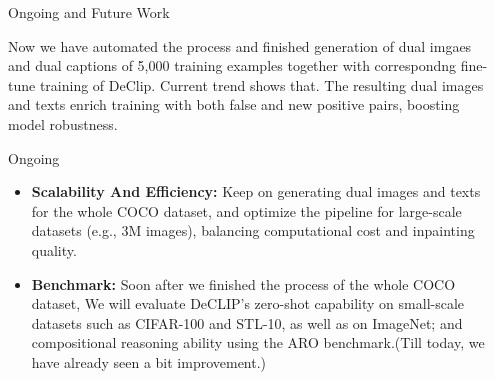 \documentclass[final]{beamer}
\newlength{\sepwidth}
\newcommand{\separatorcolumn}{\begin{column}{\sepwidth}\end{column}}
\begin{document}
\begin{frame}[t]
\begin{columns}[t]
\begin{column}{0.3\textwidth}
  \begin{block}{Ongoing and Future Work}
    \begin{minipage}[t][20cm][t]{\linewidth}
    Now we have automated the process and finished generation of dual imgaes and dual captions of 5,000 training examples together with correspondng fine-tune training of DeClip. Current trend shows that.
    The resulting dual images and texts enrich training with both false and new positive pairs, boosting model robustness.
    \vspace{0.5em}
    \begin{exampleblock}{Ongoing}
    \begin{itemize}
        \item \textbf{Scalability And Efficiency:} Keep on generating dual images and texts for the whole COCO dataset, and optimize the pipeline for large-scale datasets (e.g., 3M images), balancing computational cost and inpainting quality.
        \item \textbf{Benchmark:} Soon after we finished the process of the whole COCO dataset, We will evaluate DeCLIP's zero-shot capability on small-scale datasets such as CIFAR-100 and STL-10, as well as on ImageNet; and compositional reasoning ability using the ARO benchmark.(Till today, we have already seen a bit improvement.)
    \end{itemize}
    \end{exampleblock}

    \end{minipage}
  \end{block}
  

\end{column}


  


\separatorcolumn
\end{columns}
\end{frame}
\end{document}
